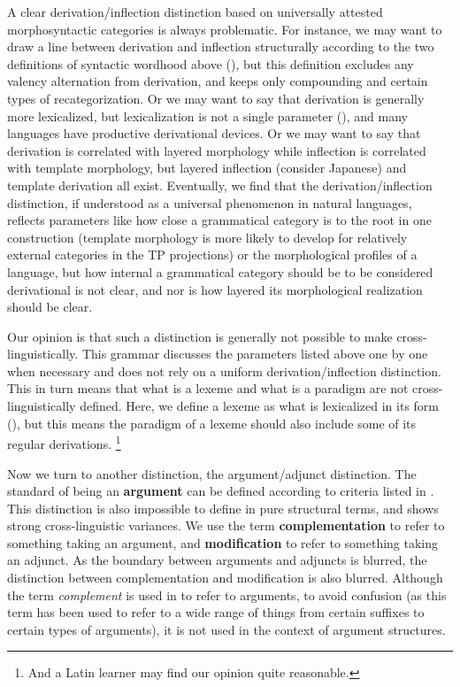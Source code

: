 \documentclass[UTF8, a4paper, oneside, scheme=plain, 12pt]{ctexrep}
\newcommand*{\concept}[1]{\textbf{#1}}
\newcommand*{\term}[1]{\emph{#1}}
\begin{document}
{A clear derivation/inflection distinction based on universally attested morphosyntactic categories is always problematic.
For instance, we may want to draw a line between derivation and inflection structurally
according to the two definitions of syntactic wordhood above (),
but this definition excludes any valency alternation from derivation,
and keeps only compounding and certain types of recategorization.
Or we may want to say that derivation is generally more lexicalized,
but lexicalization is not a single parameter (),
and many languages have productive derivational devices.
Or we may want to say that derivation is correlated with layered morphology
while inflection is correlated with template morphology,
but layered inflection (consider Japanese)
and template derivation all exist.
Eventually, we find that the derivation/inflection distinction,
if understood as a universal phenomenon in natural languages,
reflects parameters like how close a grammatical category is to the root in one construction
(template morphology is more likely to develop for
relatively external categories in the TP projections)
or the morphological profiles of a language,
but how internal a grammatical category should be to be considered derivational is not clear,
and nor is how layered its morphological realization should be clear.

Our opinion is that such a distinction is generally not possible to make cross-linguistically.
This grammar discusses the parameters listed above one by one when necessary
and does not rely on a uniform derivation/inflection distinction.
This in turn means that what is a lexeme and what is a paradigm are not cross-linguistically defined.
Here, we define a lexeme as what is lexicalized in its form (),
but this means the paradigm of a lexeme should also include some of its regular derivations.%
\footnote{
    And a Latin learner may find our opinion quite reasonable.
}


Now we turn to another distinction, the argument/adjunct distinction.
The standard of being an \concept{argument} can be defined according to criteria listed in .
This distinction is also impossible to define in pure structural terms,
and shows strong cross-linguistic variances.
We use the term \concept{complementation} to refer to something taking an argument,
and \concept{modification} to refer to something taking an adjunct.
As the boundary between arguments and adjuncts is blurred,
the distinction between complementation and modification is also blurred.
Although the term \term{complement} is used in \citet{cgel} to refer to arguments,
to avoid confusion (as this term has been used to refer to a wide range of things
from certain suffixes to certain types of arguments),
it is not used in the context of argument structures.

}
\end{document}
